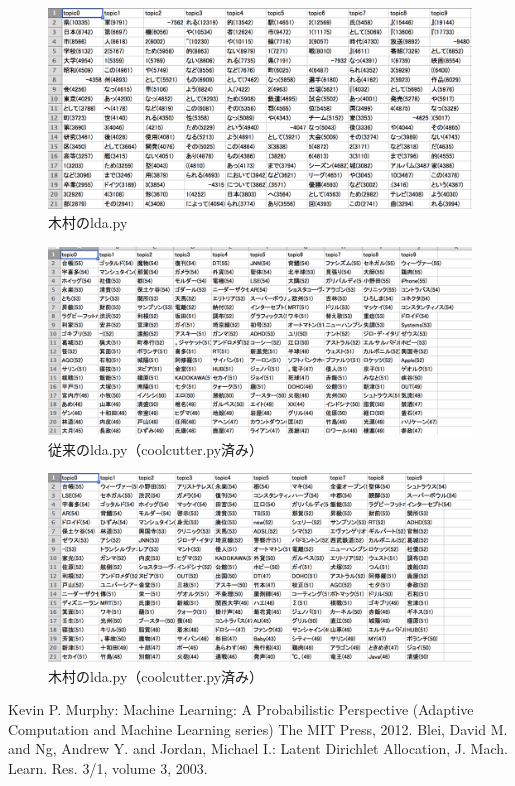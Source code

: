 \documentclass[uplatex,dvipdfmx]{jsarticle}
\begin{document}
\begin{figure}[htb]
\includegraphics[width=16cm]{topicsnewnoncool.png}
\caption{木村のlda.py}
\end{figure}

\begin{figure}[htb]
\includegraphics[width=16cm]{topicsoldcool.png}
\caption{従来のlda.py（coolcutter.py済み）}
\end{figure}

\begin{figure}[htb]
\includegraphics[width=16cm]{topicsnewcool.png}
\caption{木村のlda.py（coolcutter.py済み）}
\end{figure}

\begin{thebibliography}{99}
   Kevin P. Murphy: Machine Learning: A Probabilistic Perspective (Adaptive Computation and Machine Learning series) The MIT Press, 2012.
   Blei, David M. and Ng, Andrew Y. and Jordan, Michael I.: Latent Dirichlet Allocation,
J. Mach. Learn. Res. 3/1, volume 3, 2003.
\end{thebibliography}
\end{document}
